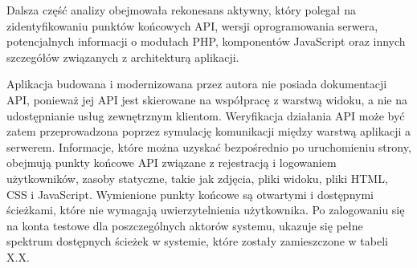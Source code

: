 \documentclass[12pt,twoside]{book}
\begin{document}
Dalsza część analizy obejmowała rekonesans aktywny, który polegał na zidentyfikowaniu punktów końcowych API, wersji oprogramowania serwera, potencjalnych informacji o modułach PHP, komponentów JavaScript oraz innych szczegółów związanych z architekturą aplikacji.

Aplikacja budowana i modernizowana przez autora nie posiada dokumentacji API, ponieważ jej API jest skierowane na współpracę z warstwą widoku, a nie na udostępnianie usług zewnętrznym klientom. Weryfikacja działania API może być zatem przeprowadzona poprzez symulację komunikacji między warstwą aplikacji a serwerem. Informacje, które można uzyskać bezpośrednio po uruchomieniu strony, obejmują punkty końcowe API związane z rejestracją i logowaniem użytkowników, zasoby statyczne, takie jak zdjęcia, pliki widoku, pliki HTML, CSS i JavaScript. Wymienione punkty końcowe są otwartymi i dostępnymi ścieżkami, które nie wymagają uwierzytelnienia użytkownika. Po zalogowaniu się na konta testowe dla poszczególnych aktorów systemu, ukazuje się pełne spektrum dostępnych ścieżek w systemie, które zostały zamieszczone w tabeli X.X.
\end{document}
